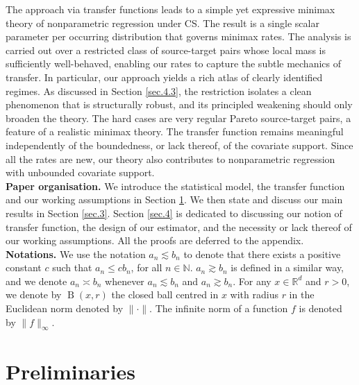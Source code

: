 \documentclass[10pt]{article}
\newcommand{\NN}{\mathbb{N}}
\newcommand{\RR}{\mathbb{R}}
\newcommand{\B}{\operatorname{B}}
\begin{document}
The approach via transfer functions leads to a simple yet expressive minimax theory of nonparametric regression under CS. The result is a single scalar parameter per occurring distribution that governs minimax rates. The analysis is carried out over a restricted class of source-target pairs whose local mass is sufficiently well-behaved, enabling our rates to capture the subtle mechanics of transfer. In particular, our approach yields a rich atlas of clearly identified regimes. As discussed in Section \ref{sec.4.3}, the restriction isolates a clean phenomenon that is structurally robust, and its principled weakening should only broaden the theory. The hard cases are very regular Pareto source-target pairs, a feature of a realistic minimax theory. The transfer function remains meaningful independently of the boundedness, or lack thereof, of the covariate support. Since all the rates are new, our theory also contributes to nonparametric regression with unbounded covariate support.\\


\noindent \textbf{Paper organisation.} We introduce the statistical model, the transfer function and our working assumptions in Section \ref{sec.2}. We then state and discuss our main results in Section \ref{sec.3}. Section \ref{sec.4} is dedicated to discussing our notion of transfer function, the design of our estimator, and the necessity or lack thereof of our working assumptions. All the proofs are deferred to the appendix.\\

\noindent\textbf{Notations.}
We use the notation $a_n \lesssim b_n$ to denote that there exists a positive constant $c$ such that $a_n \leq c b_n$, for all $n \in \NN$. $a_n \gtrsim b_n$ is defined in a similar way, and we denote $a_n \asymp b_n$ whenever $a_n \lesssim b_n$ and $a_n \gtrsim b_n.$
For any $x \in \RR^d$ and $r > 0$, we denote by $\B(x,r)$ the closed ball centred in $x$ with radius $r$ in the Euclidean norm denoted by $\|\cdot\|.$ The infinite norm of a function $f$ is denoted by $\|f\|_{\infty}.$ 

\section{Preliminaries}\label{sec.2}
\end{document}
